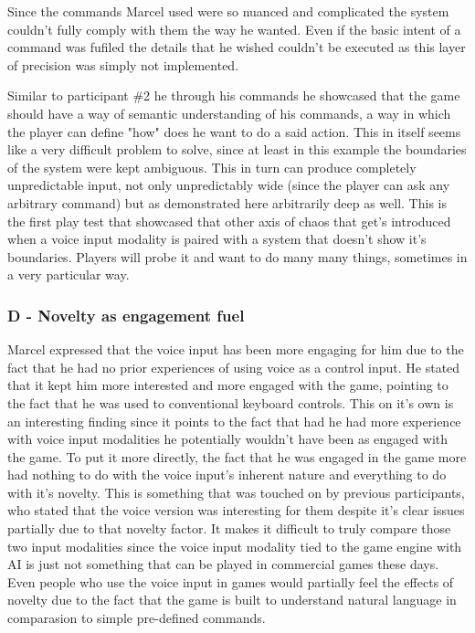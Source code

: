Since the commands Marcel used were so nuanced and complicated the system couldn't fully comply with them the way he wanted. Even if the basic intent of a command was fufiled the details that he wished couldn't be executed as this layer of precision was simply not implemented.

Similar to participant \#2 he through his commands he showcased that the game should have a way of semantic understanding of his commands, a way in which the player can define "how" does he want to do a said action. This in itself seems like a very difficult problem to solve, since at least in this example the boundaries of the system were kept ambiguous. This in turn can produce completely unpredictable input, not only unpredictably wide (since the player can ask any arbitrary command) but as demonstrated here arbitrarily deep as well. This is the first play test that showcased that other axis of chaos that get's introduced when a voice input modality is paired with a system that doesn't show it's boundaries. Players will probe it and want to do many many things, sometimes in a very particular way.


\subsubsection{D - Novelty as engagement fuel}

Marcel expressed that the voice input has been more engaging for him due to the fact that he had no prior experiences of using voice as a control input. He stated that it kept him more interested and more engaged with the game, pointing to the fact that he was used to conventional keyboard controls. 
This on it's own is an interesting finding since it points to the fact that had he had more experience with voice input modalities he potentially wouldn't have been as engaged with the game. To put it more directly, the fact that he was engaged in the game more had nothing to do with the voice input's inherent nature and everything to do with it's novelty. 
This is something that was touched on by previous participants, who stated that the voice version was interesting for them despite it's clear issues partially due to that novelty factor. 
It makes it difficult to truly compare those two input modalities since the voice input modality tied to the game engine with AI is just not something that can be played in commercial games these days. Even people who use the voice input in games would partially feel the effects of novelty due to the fact that the game is built to understand natural language in comparasion to simple pre-defined commands. 





